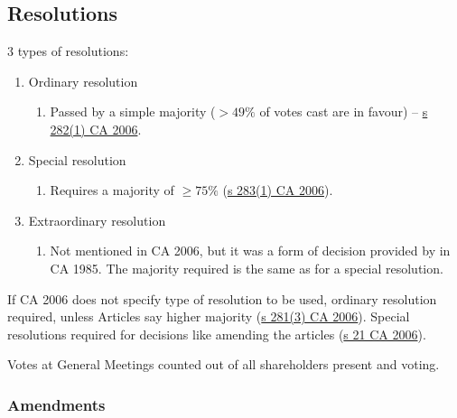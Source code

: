 \documentclass[
]{article}
\providecommand{\tightlist}{%
  \setlength{\itemsep}{0pt}\setlength{\parskip}{0pt}}
\begin{document}
\hypertarget{resolutions}{%
\subsection{Resolutions}\label{resolutions}}

3 types of resolutions:

\begin{enumerate}
\tightlist
\item
  Ordinary resolution

  \begin{enumerate}
  \tightlist
  \item
    Passed by a simple majority ({\(> 49\%\)} of votes cast are in
    favour) --
    \href{https://www.legislation.gov.uk/ukpga/2006/46/section/282}{s
    282(1) CA 2006}.
  \end{enumerate}
\item
  Special resolution

  \begin{enumerate}
  \tightlist
  \item
    Requires a majority of {\(\geq 75\%\)}
    (\href{https://www.legislation.gov.uk/ukpga/2006/46/section/283}{s
    283(1) CA 2006}).
  \end{enumerate}
\item
  Extraordinary resolution

  \begin{enumerate}
  \tightlist
  \item
    Not mentioned in CA 2006, but it was a form of decision provided by
    in CA 1985. The majority required is the same as for a special
    resolution.
  \end{enumerate}
\end{enumerate}

If CA 2006 does not specify type of resolution to be used, ordinary
resolution required, unless Articles say higher majority
(\href{https://www.legislation.gov.uk/ukpga/2006/46/section/281}{s
281(3) CA 2006}). Special resolutions required for decisions like
amending the articles
(\href{https://www.legislation.gov.uk/ukpga/2006/46/section/21}{s 21 CA
2006}).

Votes at General Meetings counted out of all shareholders present and
voting.

\hypertarget{amendments}{%
\subsubsection{Amendments}\label{amendments}}
\end{document}

